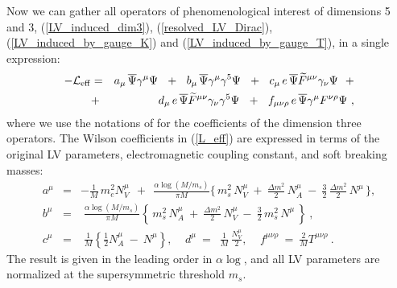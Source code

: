 \documentclass[12pt]{revtex4}
\begin{document}
Now we can gather all operators of phenomenological
interest of dimensions 5 and 3, 
(\ref{LV_induced_dim3}), (\ref{resolved_LV_Dirac}),
(\ref{LV_induced_by_gauge_K}) and
(\ref{LV_induced_by_gauge_T}), in a single expression:
\begin{eqnarray}
\label{L_eff}
 - \mathcal{L}_{\rm eff}
        & = &
        a_\mu\, \overline{\Psi} \gamma^\mu \Psi
~~+~~
b_\mu\, \overline{\Psi} \gamma^\mu \gamma^5 \Psi
~~+~~
c_\mu\, e\, \overline{\Psi} \widetilde{F}^{\mu\nu}
                    \gamma_\nu \Psi
        ~~+\\
\nonumber
& + &
d_\mu\, e\, \overline{\Psi} \widetilde{F}^{\mu\nu}
                    \gamma_\nu \gamma^5 \Psi
        ~~+~~
        f_{\mu\nu\rho}\, 
     e\, \overline{\Psi} \gamma^\mu F^{\nu\rho} \Psi
~,
\end{eqnarray}
where we use the notations of 
\cite{Colladay:1998fq}
for the coefficients of the 
dimension three operators.
The Wilson coefficients in (\ref{L_eff}) are expressed in terms of the 
original LV parameters, electromagnetic coupling constant, and soft breaking masses:
\begin{eqnarray}
\nonumber
        a^\mu & = &
	 -\frac{1}{M}\, m_e^2 N_V^\mu 
	~~+~~
	\frac{\alpha\log (M/m_s)}{\pi M}
	\Biggl\{\,
         m_s^2\, N_V^\mu 
		~+~
		 \frac{\Delta m^2}{2}\, 
                                             N_A^\mu
		~-~
		\frac{3}{2}\, \frac{\Delta m^2}{2}\, 
                                               N^\mu
       		\,
	\Biggr\},
\\
\label{L_eff_coefs}
	b^\mu & = & 
	\;
	\frac{\alpha\log (M/m_s)}{\pi M}
	\left\{\,
        	 m_s^2\, N_A^\mu
		~+~
		 \frac{\Delta m^2}{2}\, 
                                             N_V^\mu
		~-~
		\frac{3}{2}\, m_s^2\, N^\mu
       		\,
	\right\} ~,
\\
\nonumber
	c^\mu & = &
	\;
	\frac{1}{M}
	\left\{ 
       		\frac{1}{2}N_A^\mu
       		~-~
       		N^\mu
	\right\} ,~~~~~
	d^\mu ~=~
	\;
	\frac{1}{M}\, \frac{N_V^\mu}{2} 
,~~~~~
	f^{\mu\nu\rho} ~ = ~
	\frac{2}{M} T^{\mu\nu\rho}
~.
\end{eqnarray}
        The result is given in the leading order in $\alpha \log$,
        and all LV parameters are normalized at the supersymmetric threshold $m_s$.  
\end{document}
